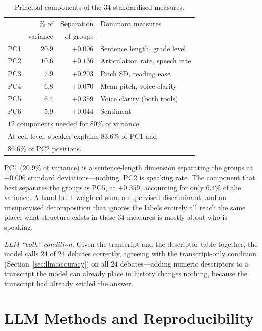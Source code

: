 \documentclass[journal]{IEEEtran}
\begin{document}
\begin{table}[h]
\caption{Principal components of the $34$ standardised measures.}
\label{tab:pca}
\centering
\footnotesize
\setlength{\tabcolsep}{3pt}
\begin{tabular}{lrrl}
\toprule
 & \% of & Separation & Dominant measures \\
 & variance & of groups & \\
\midrule
PC1 & $20.9$ & $+0.006$ & Sentence length, grade level \\
PC2 & $10.6$ & $+0.136$ & Articulation rate, speech rate \\
PC3 & $7.9$  & $+0.203$ & Pitch SD, reading ease \\
PC4 & $6.8$  & $+0.070$ & Mean pitch, voice clarity \\
PC5 & $6.4$  & $+0.359$ & Voice clarity (both tools) \\
PC6 & $5.9$  & $+0.044$ & Sentiment \\
\midrule
\multicolumn{4}{l}{$12$ components needed for $80\%$ of variance.} \\
\multicolumn{4}{l}{At cell level, speaker explains $83.6\%$ of PC1 and} \\
\multicolumn{4}{l}{$86.6\%$ of PC2 positions.} \\
\bottomrule
\end{tabular}
\end{table}

PC1 ($20.9\%$ of variance) is a sentence-length dimension separating the
groups at $+0.006$ standard deviations---nothing. PC2 is speaking rate. The
component that best separates the groups is PC5, at $+0.359$, accounting for
only $6.4\%$ of the variance. A hand-built weighted sum, a supervised
discriminant, and an unsupervised decomposition that ignores the labels
entirely all reach the same place: what structure exists in these $34$
measures is mostly about who is speaking.

\emph{LLM ``both'' condition.} Given the transcript and the descriptor table
together, the model calls $24$ of $24$ debates correctly, agreeing with the
transcript-only condition (Section~\ref{sec:llm:accuracy}) on all $24$
debates---adding numeric descriptors to a transcript the model can already
place in history changes nothing, because the transcript had already
settled the answer.

\section{LLM Methods and Reproducibility}
\label{app:llmrepro}
\end{document}
